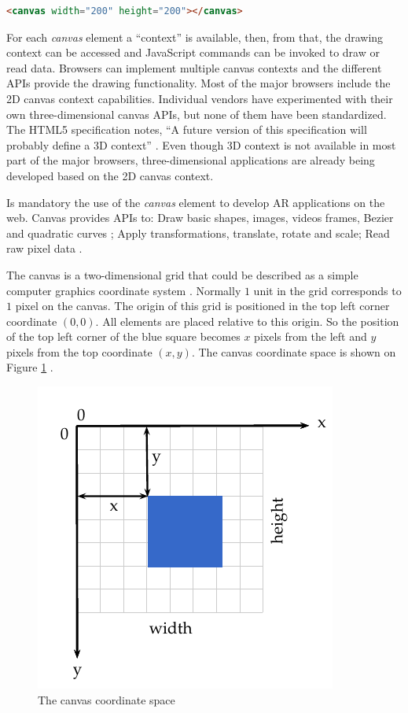 \begin{lstlisting}[language=HTML,label={lst:canvas_element_markup},caption=The HTML canvas element markup]
<canvas width="200" height="200"></canvas>
\end{lstlisting}

For each \textit{canvas} element a ``context'' is available, then, from that, the drawing context can be accessed and JavaScript commands can be invoked to draw or read data. Browsers can implement multiple canvas contexts and the different APIs provide the drawing functionality. Most of the major browsers include the 2D canvas context capabilities. Individual vendors have experimented with their own three-dimensional canvas APIs, but none of them have been standardized. The HTML5 \cite{Hickson2013} specification notes, ``A future version of this specification will probably define a 3D context'' \cite{Canvas2013}. Even though 3D context is not available in most part of the major browsers, three-dimensional applications are already being developed based on the 2D canvas context.

Is mandatory the use of the \textit{canvas} element to develop AR applications on the web. Canvas provides APIs to: Draw basic shapes, images, videos frames, Bezier and quadratic curves \cite{Hartley2004}; Apply transformations, translate, rotate and scale; Read raw pixel data \etc.

 The canvas is a two-dimensional grid that could be described as a simple computer graphics coordinate system \cite{Hartley2004}. Normally $1$ unit in the grid corresponds to $1$ pixel on the canvas. The origin of this grid is positioned in the top left corner coordinate $(0,0)$. All elements are placed relative to this origin. So the position of the top left corner of the blue square becomes $x$ pixels from the left and $y$ pixels from the top coordinate $(x,y)$. The canvas coordinate space is shown on Figure \ref{figure:canvas_axis} \cite{MDN2013}.

 \begin{figure}[!htb]
   \centering
   \includegraphics{chapters/basic_concepts/canvas_axis.pdf}
   \caption{The canvas coordinate space}
   \label{figure:canvas_axis}
 \end{figure}

